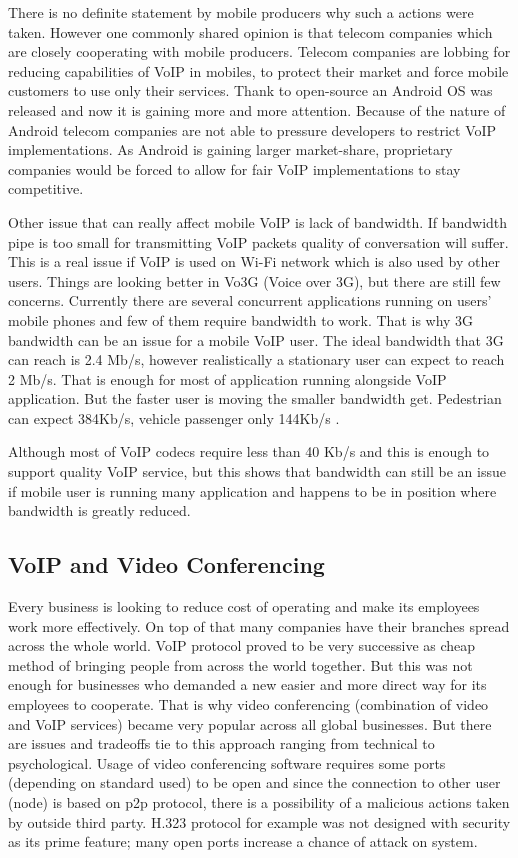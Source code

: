 There is no definite statement by mobile producers why such a actions were taken. However one commonly shared opinion is that telecom companies which are closely cooperating with mobile producers. Telecom companies are lobbing for reducing capabilities of VoIP in mobiles, to protect their market and force mobile customers to use only their services. Thank to open-source an Android OS was released and now it is gaining more and more attention. Because of the nature of Android telecom companies are not able to pressure developers to restrict VoIP implementations. As Android is gaining larger market-share, proprietary companies would be forced to allow for fair VoIP implementations to stay competitive.

Other issue that can really affect mobile VoIP is lack of bandwidth. If bandwidth pipe is too small for transmitting VoIP packets quality of conversation will suffer. This is a real issue if VoIP is used on Wi-Fi network which is also used by other users. Things are looking better in Vo3G (Voice over 3G), but there are still few concerns. Currently there are several concurrent applications running on users' mobile phones and few of them require bandwidth to work. That is why 3G bandwidth can be an issue for a mobile VoIP user. The ideal bandwidth that 3G can reach is 2.4 Mb/s, however realistically a stationary user can expect to reach 2 Mb/s. That is enough for most of application running alongside VoIP application. But the faster user is moving the smaller bandwidth get. Pedestrian can expect 384Kb/s, vehicle passenger only 144Kb/s \cite{website:3g_spec}. 

Although most of VoIP codecs require less than 40 Kb/s and this is enough to support quality VoIP service\cite{website:voip_codecs}, but this shows that bandwidth can still be an issue if mobile user is running many application and happens to be in position where bandwidth is greatly reduced.


\subsection{VoIP and Video Conferencing}
Every business is looking to reduce cost of operating and make its employees work more effectively. On top of that many companies have their branches spread across the whole world. VoIP protocol proved to be very successive as cheap method of bringing people from across the world together. But this was not enough for businesses who demanded a new easier and more direct way for its employees to cooperate. That is why video conferencing (combination of video and VoIP services) became very popular across all global businesses. But there are issues and tradeoffs tie to this approach ranging from technical to psychological. 
Usage of video conferencing software requires some ports (depending on standard used) to be open and since the connection to other user (node) is based on p2p protocol, there is a possibility of a malicious actions taken by outside third party. H.323 protocol for example was not designed with security as its prime feature; many open ports increase a chance of attack on system\cite{website:vid_conf_voice_protocol_overview}.

